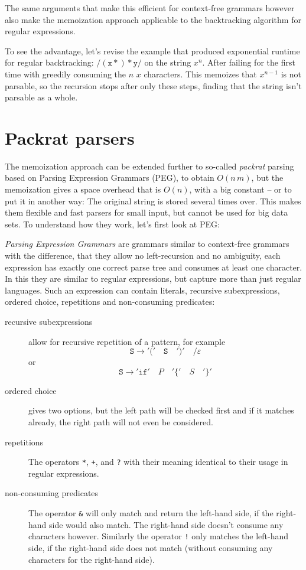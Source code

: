 \documentclass[11pt,a4paper,twoside,openright]{Thesis}
\theoremstyle{definition}
\newcommand{\regex}[1]{\ensuremath{\mathtt{/#1/}}}
\begin{document}
The same arguments that make this efficient for context-free grammars however
also make the memoization approach applicable to the backtracking algorithm
for regular expressions.

To see the advantage, let's revise the example that produced exponential runtime
for regular backtracking: \regex{(x*)*y} on the string $x^n$. After failing
for the first time with greedily consuming the $n$ $x$ characters. This
memoizes that $x^{n-1}$ is not parsable, so the recursion stops after only
these steps, finding that the string isn't parsable as a whole.

\section{Packrat parsers}
The memoization approach can be extended further to so-called \emph{packrat}
parsing\cite{Mede12a} based on Parsing Expression Grammars (PEG), to obtain
$O(n\,m)$, but the memoization gives a space overhead that is
$O(n)$, with a big constant\cite{Ford02a} -- or to put it in another way: The
original string is stored several times over. This makes them flexible and fast
parsers for small input, but cannot be used for big data sets. To understand
how they work, let's first look at PEG:

\emph{Parsing Expression Grammars} are grammars similar to context-free
grammars with the difference, that they allow no left-recursion and no
ambiguity, each expression has exactly one correct parse tree and consumes at
least one character. In this they are similar to regular expressions, but
capture more than just regular languages.  Such an expression can contain
literals, recursive subexpressions, ordered choice, repetitions and
non-consuming predicates:

\begin{description}
  \item[recursive subexpressions] allow for recursive repetition of a
    pattern, for example
    \[\mathtt{S} \rightarrow \mathtt{'('}\quad \mathtt{S}\quad \mathtt{')'}\quad \mathtt{/} \varepsilon \]
    or
    \[ \mathtt{S} \rightarrow \mathtt{'if'}\quad P\quad \mathtt{'\{'}\quad S\quad \mathtt{'\}'}\]
  \item[ordered choice] gives two options, but the left path will be checked
    first and if it matches already, the right path will not even be considered.
  \item[repetitions] The operators \texttt{*}, \texttt{+}, and \texttt{?}
    with their meaning identical to their usage in regular expressions.
  \item[non-consuming predicates] The operator \texttt{\&} will only match and
    return the left-hand side, if the right-hand side would also match. The
    right-hand side doesn't consume any characters however. Similarly the
    operator \texttt{!} only matches the left-hand side, if the right-hand
    side does not match (without consuming any characters for the right-hand side).
\end{description}
\end{document}
